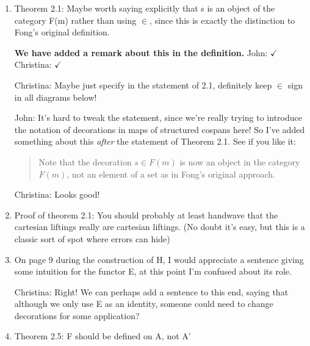 \documentclass[reqno]{amsart}
\def\chris{\color{purple} Christina: }
\def\john{\color{red} John: }
\begin{document}
\begin{enumerate}
{\chris Not sure that `covariant' would make this clearer...both are very well the Grothendieck construction I would think, but I don't mind that 
much.}

\item Theorem 2.1: Maybe worth saying explicitly that s is an object of the category F(m) rather than using $\in$, since this is exactly the 
distinction to 
Fong's original definition.

{\bf  We have added a remark about this in the definition.}   {\john $\checkmark$} {\chris $\checkmark$}

{\chris Maybe just specify in the statement of 2.1, definitely keep $\in$ sign in all diagrams below!}

{\john It's hard to tweak the statement, since we're really trying to introduce the notation of decorations in maps of structured cospans here!    So 
I've added something about this \emph{after} the statement of Theorem 2.1.  See if you like it:
\begin{quote} 
Note that the decoration $s \in F(m)$ is now an object in the category $F(m)$, not an element of a set as in Fong's original approach. 
\end{quote}}

{\chris Looks good!}

\item Proof of theorem 2.1: You should probably at least handwave that the cartesian liftings really are cartesian liftings. (No doubt it’s easy, but 
this 
is a classic sort of spot where errors can hide)

\item On page 9 during the construction of H, I would appreciate a sentence giving some intuition for the functor E, at this point I’m confused about 
its 
role.

{}

{\chris Right! We can perhaps add a sentence to this end, saying that although we only use E as an identity, someone could need to change decorations 
for some application?}

\item Theorem 2.5: F should be defined on A, not A’


\end{enumerate}
\end{document}
